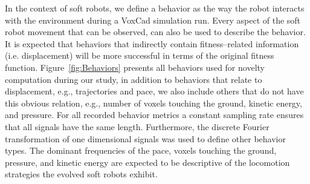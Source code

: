 \documentclass{sig-alternate}
\begin{document}

In the context of soft robots, we define a behavior as the way the robot interacts with the environment during a VoxCad simulation run. Every aspect of the soft robot movement that can be observed, can also be used to describe the behavior. 
It is expected that behaviors that indirectly contain fitness--related information (i.e. displacement) will be more successful in terms of the original fitness function. Figure~\ref{fig:Behaviors} presents all behaviors used for novelty computation during our study, in addition to behaviors that relate to displacement, e.g., trajectories and pace, we also include others that do not have this obvious relation, e.g., number of voxels touching the ground, kinetic energy, and pressure. For all recorded behavior metrics a constant sampling rate ensures that all signals have the same length. Furthermore, the discrete Fourier transformation of one dimensional signals was used to define other behavior types. The dominant frequencies of the pace, voxels touching the ground, pressure, and kinetic energy are expected to be descriptive of the locomotion strategies the evolved soft robots exhibit.
\end{document}
